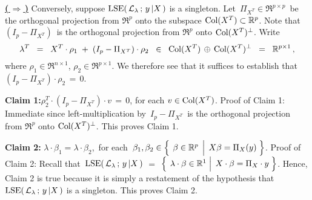 \vskip 0.5cm\noindent
\underline{\textbf{(\,$\Longrightarrow$\,)}}\quad
Conversely, suppose $\textnormal{LSE}\!\left(\,\mathcal{L}_{\lambda} \,;\, y\,\vert X\,\right)$ is a singleton.
Let \,$\Pi_{X^{T}} \in \Re^{p \times p}$\, be the orthogonal projection from $\Re^{p}$ onto
the subspace $\textnormal{Col}(X^{T}) \subset \mathbb{R}^{p}$.
Note that \,$(I_{p} - \Pi_{X^{T}})$\, is the orthogonal projection from $\Re^{p}$ onto $\textnormal{Col}(X^{T})^{\perp}$.
Write
\begin{equation*}
\lambda^{T}
\;\;=\;\;
	X^{T} \cdot \rho_{1} \;+\; (I_{p} - \Pi_{X^{T}}) \cdot \rho_{2}
\;\;\in\;\;
	\textnormal{Col}(X^{T}) \,\oplus\, \textnormal{Col}(X^{T})^{\perp}
\;\;=\;\;
	\mathbb{R}^{p \times 1}\,,
\end{equation*}
where $\rho_{1} \in \Re^{n \times 1}$, $\rho_{2} \in \Re^{p \times 1}$.
We therefore see that it suffices to establish that $(I_{p} - \Pi_{X^{T}}) \cdot \rho_{2} \,=\, 0$.

\vskip 0.5cm
\noindent
\textbf{Claim 1:}\quad $\rho_{2}^{T} \cdot (I_{p} - \Pi_{X^{T}}) \cdot v \,=\, 0$,
for each $v \in \textnormal{Col}(X^{T})$.
\vskip 0.2cm
\noindent
Proof of Claim 1:\quad
Immediate since left-multiplication by \,$I_{p} - \Pi_{X^{T}}$\, is the orthogonal projection
from $\Re^{p}$ onto $\textnormal{Col}(X^{T})^{\perp}$. This proves Claim 1.

\vskip 0.5cm
\noindent
\textbf{Claim 2:}\quad
$\lambda\cdot\beta_{1} = \lambda\cdot\beta_{2}$,\,
for each \,$\beta_{1}, \beta_{2} \in \left\{\;\left.\overset{{\color{white}.}}{\beta} \in \Re^{p} \;\,\right\vert\; X\beta=\Pi_{X}(y) \;\right\}$.
\vskip 0.2cm
\noindent
Proof of Claim 2:\quad
Recall that \,$\textnormal{LSE}\!\left(\,\mathcal{L}_{\lambda}\,;\,y\,\vert X\,\right)$ $=$
$\left\{\;\left.\overset{{\color{white}.}}{\lambda}\cdot\beta\in\Re^{1}\;\right\vert\;X\cdot\beta=\Pi_{X}\cdot y\;\right\}$.
Hence, Claim 2 is true because it is simply a restatement of the hypothesis that
$\textnormal{LSE}\!\left(\,\mathcal{L}_{\lambda}\,;\,y\,\vert X\,\right)$ is a singleton.
This proves Claim 2.

